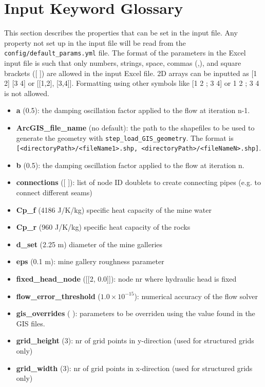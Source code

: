 \begin{enumerate}
\end{enumerate}


\section{Input Keyword Glossary}
\label{sec:glossary}
This section describes the properties that can be set in the input file. Any property not set up in the input file will be read from the \verb|config/default_params.yml| file. The format of the parameters in the Excel input file is such that only numbers, strings, space, commas (,), and square brackets ([ ]) are allowed in the input Excel file.
2D arrays can be inputted as [1 2] [3 4] or [[1,2], [3,4]]. Formatting using other symbols like [1 2 ; 3 4] or 1 2 ; 3 4 is not allowed.

\begin{itemize}
\item {\bf a} (0.5): the damping oscillation factor applied to the flow at iteration n-1.
\item {\bf ArcGIS\_file\_name} (no default): the path to the shapefiles to be used to generate the geometry with \texttt{step\_load\_GIS\_geometry}. The format is 
        \texttt{[<directoryPath>/<fileName1>.shp, <directoryPath>/<fileNameN>.shp]}.
\item {\bf b} (0.5): the damping oscillation factor applied to the flow at iteration n.
\item {\bf connections} ([ ]): list of node ID doublets to create connecting pipes (e.g. to connect different seams)
\item {\bf Cp\_f} (4186 J/K/kg) specific heat capacity of the mine water 
\item {\bf Cp\_r} (960 J/K/kg) specific heat capacity of the rocks 
\item {\bf d\_set} (2.25 m) diameter of the mine galleries 
\item {\bf eps} (0.1 m): mine gallery roughness parameter 
\item {\bf fixed\_head\_node} ([[2, 0.0]]): node nr where hydraulic head is fixed 
\item {\bf flow\_error\_threshold} ($1.0 \times 10^{-15}$): numerical accuracy of the flow solver 
\item {\bf gis\_overrides} ( ):  parameters to be overriden using the value found in the GIS files.
\item {\bf grid\_height} (3): nr of grid points in y-direction (used for structured grids only) 
\item {\bf grid\_width} (3): nr of grid points in x-direction (used for structured grids only) 

\end{itemize}
